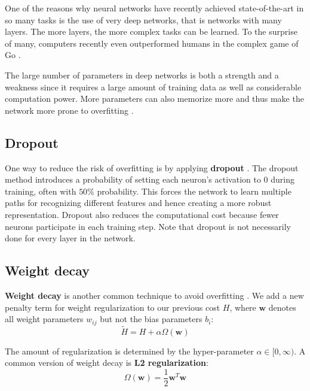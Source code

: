 One of the reasons why neural networks have recently achieved state-of-the-art in so many tasks is the use of very deep networks, that is networks with many layers.
The more layers, the more complex tasks can be learned. To the surprise of many, computers recently even outperformed humans in the complex game of Go \cite{AlphaGo, AlphaGoTuringTest}.

The large number of parameters in deep networks is both a strength and a weakness since it requires a large amount of training data as well as considerable computation power. More parameters can also memorize more and thus make the network more prone to overfitting \cite{AlexNet}.

\subsection{Dropout}

One way to reduce the risk of overfitting is by applying \textbf{dropout}  \cite{Dropout, AlexNet, FornesCnnCategorization}.
The dropout method introduces a probability of setting each neuron's activation to $0$ during training, often with $50\%$ probability. This forces the network to learn multiple paths for recognizing different features and hence creating a more robust representation. Dropout also reduces the computational cost because fewer neurons participate in each training step.
Note that dropout is not necessarily done for every layer in the network.


\subsection{Weight decay}

\textbf{Weight decay} \cite{WeightDecay} is another common technique to avoid overfitting \cite[Chapter~7]{GoodfellowBook}. We add a new penalty term for weight regularization to our previous cost $H$, where $\mathbf{w}$ denotes all weight parameters $w_{ij}$ but not the bias parameters $b_i$:
\[
\tilde{H} = H + \alpha \Omega(\mathbf{w})
\]

The amount of regularization is determined by the hyper-parameter $\alpha \in [0,\infty)$.
A common version of weight decay is \textbf{L2 regularization}:
\[
\Omega(\mathbf{w}) = \frac{1}{2} \mathbf{w}^T \mathbf{w}
\]

